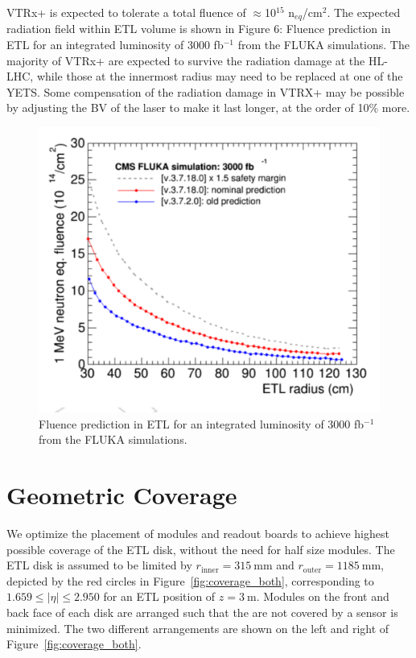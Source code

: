 \documentclass[11pt]{article}
\begin{document}
VTRx+ is expected to tolerate a total fluence of $\approx$10$^{15}$ n$_{eq}$/cm$^{2}$. The expected radiation field within ETL volume is shown in Figure 6: Fluence prediction in ETL for an integrated luminosity of 3000 fb$^{-1}$ from the FLUKA simulations. The majority of VTRx+ are expected to survive the radiation damage at the HL-LHC, while those at the innermost radius may need to be replaced at one of the YETS. Some compensation of the radiation damage in VTRX+ may be possible by adjusting the BV of the laser to make it last longer, at the order of 10\% more.

\begin{figure}[!h]
\centering
\includegraphics[width=\linewidth]{figures/image6.pdf}
\caption{
Fluence prediction in ETL for an integrated luminosity of 3000 fb$^{-1}$ from the FLUKA simulations.}
\label{fig:fluka}
\end{figure}

\section{Geometric Coverage}

We optimize the placement of modules and readout boards to achieve highest possible coverage of the ETL disk, without the need for half size modules.
The ETL disk is assumed to be limited by $r_{\mathrm{inner}}=315~\mathrm{mm}$ and $r_{\mathrm{outer}}=1185~\mathrm{mm}$, depicted by the red circles in Figure~\ref{fig:coverage_both}, corresponding to $1.659 \leq |\eta| \leq 2.950$ for an ETL position of $z=3~\mathrm{m}$.
Modules on the front and back face of each disk are arranged such that the are not covered by a sensor is minimized.
The two different arrangements are shown on the left and right of Figure~\ref{fig:coverage_both}.
\end{document}
